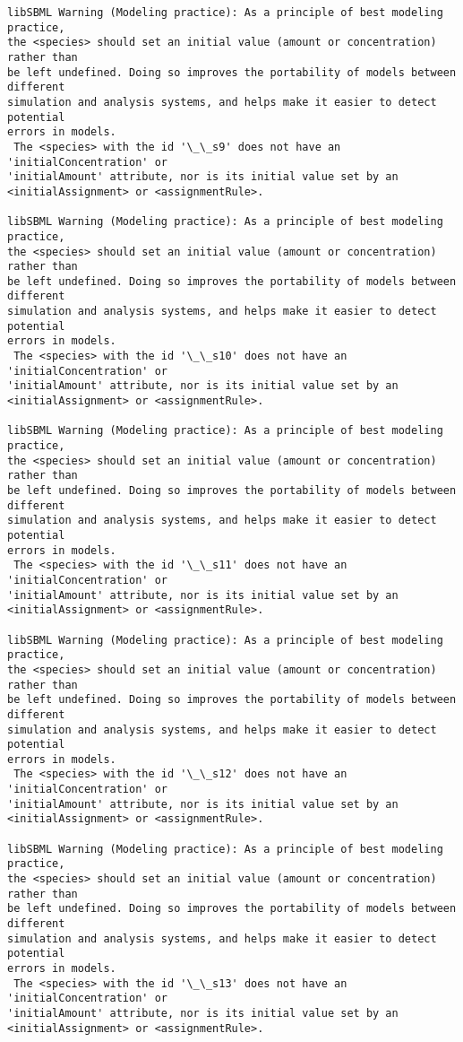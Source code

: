 \documentclass[11pt]{article}
\begin{document}
\begin{Verbatim}[commandchars=\\\{\}]
libSBML Warning (Modeling practice): As a principle of best modeling practice,
the <species> should set an initial value (amount or concentration) rather than
be left undefined. Doing so improves the portability of models between different
simulation and analysis systems, and helps make it easier to detect potential
errors in models.
 The <species> with the id '\_\_s9' does not have an 'initialConcentration' or
'initialAmount' attribute, nor is its initial value set by an
<initialAssignment> or <assignmentRule>.

libSBML Warning (Modeling practice): As a principle of best modeling practice,
the <species> should set an initial value (amount or concentration) rather than
be left undefined. Doing so improves the portability of models between different
simulation and analysis systems, and helps make it easier to detect potential
errors in models.
 The <species> with the id '\_\_s10' does not have an 'initialConcentration' or
'initialAmount' attribute, nor is its initial value set by an
<initialAssignment> or <assignmentRule>.

libSBML Warning (Modeling practice): As a principle of best modeling practice,
the <species> should set an initial value (amount or concentration) rather than
be left undefined. Doing so improves the portability of models between different
simulation and analysis systems, and helps make it easier to detect potential
errors in models.
 The <species> with the id '\_\_s11' does not have an 'initialConcentration' or
'initialAmount' attribute, nor is its initial value set by an
<initialAssignment> or <assignmentRule>.

libSBML Warning (Modeling practice): As a principle of best modeling practice,
the <species> should set an initial value (amount or concentration) rather than
be left undefined. Doing so improves the portability of models between different
simulation and analysis systems, and helps make it easier to detect potential
errors in models.
 The <species> with the id '\_\_s12' does not have an 'initialConcentration' or
'initialAmount' attribute, nor is its initial value set by an
<initialAssignment> or <assignmentRule>.

libSBML Warning (Modeling practice): As a principle of best modeling practice,
the <species> should set an initial value (amount or concentration) rather than
be left undefined. Doing so improves the portability of models between different
simulation and analysis systems, and helps make it easier to detect potential
errors in models.
 The <species> with the id '\_\_s13' does not have an 'initialConcentration' or
'initialAmount' attribute, nor is its initial value set by an
<initialAssignment> or <assignmentRule>.


\end{Verbatim}
\end{document}
